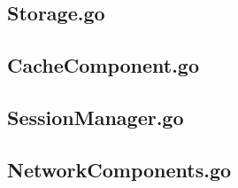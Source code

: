 \begin{appendices}
\subsection{Storage.go}
\label{sec:Storage.go}


\subsection{CacheComponent.go}
\label{sec:CacheComponent.go}


\subsection{SessionManager.go}
\label{sec:SessionManager.go}


\subsection{NetworkComponents.go}
\label{sec:NetworkComponents.go}


\end{appendices}



